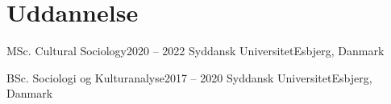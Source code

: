 \section{Uddannelse}
\mySubHeadingListStart

  \mySubHeading
    {MSc. Cultural Sociology}{2020 -- 2022}
    {Syddansk Universitet}{Esbjerg, Danmark}
    \myItemListStart
    \myItemListEnd

  \mySubHeading
    {BSc. Sociologi og Kulturanalyse}{2017 -- 2020}
    {Syddansk Universitet}{Esbjerg, Danmark}

\mySubHeadingListEnd
